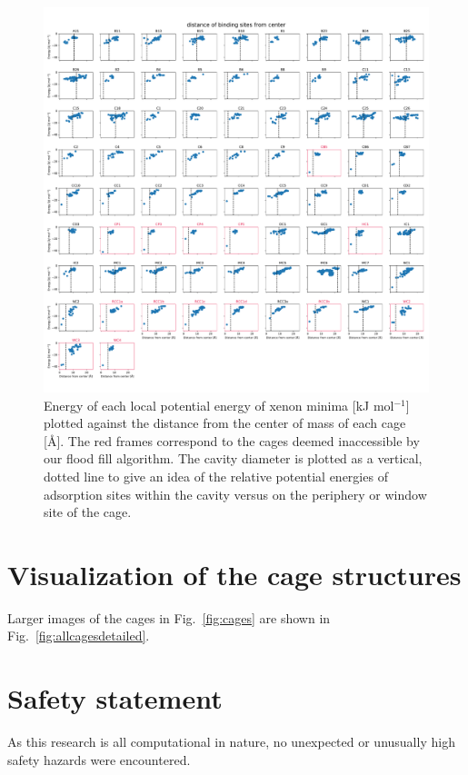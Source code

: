\documentclass[journal=jacsat,manuscript=article]{achemso}
\begin{document}
\begin{figure}
\centering
	\includegraphics[width=\columnwidth]{../distance_of_binding_sites.pdf}
	\caption{Energy of each local potential energy of xenon minima [kJ mol$^{-1}$] plotted against the distance from the center of mass of each cage [\AA]. The red frames correspond to the cages deemed inaccessible by our flood fill algorithm. The cavity diameter is plotted as a vertical, dotted line to give an idea of the relative potential energies of adsorption sites within the cavity versus on the periphery or window site of the cage.
	} \label{fig:energy_vs_dist}
\end{figure}

\clearpage

\section{Visualization of the cage structures}
Larger images of the cages in Fig.~\ref{fig:cages} are shown in Fig.~\ref{fig:allcagesdetailed}.
\captionsetup[subfigure]{labelformat=empty} %


\newpage
\clearpage

\section{Safety statement}
As this research is all computational in nature, no unexpected or unusually high safety hazards were encountered.

\clearpage


\end{document}
